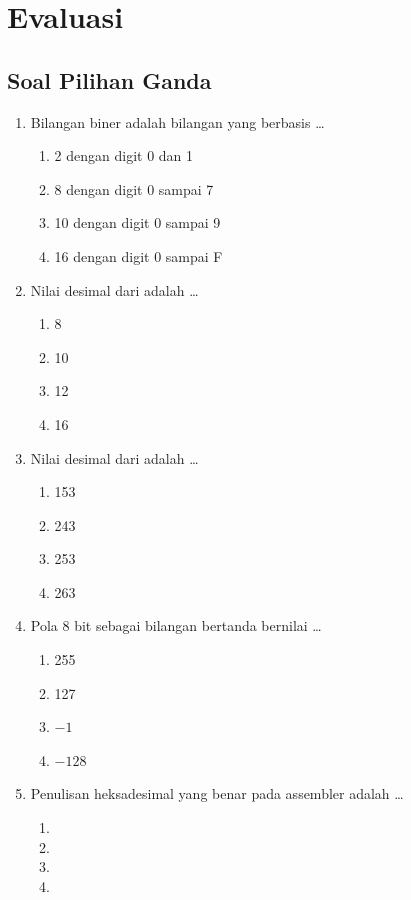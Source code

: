 \section{Evaluasi}
\label{sec:evaluasi-bab3}

\subsection{Soal Pilihan Ganda}

\begin{enumerate}
    \item Bilangan biner adalah bilangan yang berbasis \dots
          \begin{enumerate}
              \item 2 dengan digit 0 dan 1
              \item 8 dengan digit 0 sampai 7
              \item 10 dengan digit 0 sampai 9
              \item 16 dengan digit 0 sampai F
          \end{enumerate}

    \item Nilai desimal dari  adalah \dots
          \begin{enumerate}
              \item 8 \item 10 \item 12 \item 16
          \end{enumerate}

    \item Nilai desimal dari  adalah \dots
          \begin{enumerate}
              \item 153 \item 243 \item 253 \item 263
          \end{enumerate}

    \item Pola 8 bit  sebagai bilangan bertanda
          bernilai \dots
          \begin{enumerate}
              \item 255 \item 127 \item $-1$ \item $-128$
          \end{enumerate}

    \item Penulisan heksadesimal yang benar pada assembler adalah
          \dots
          \begin{enumerate}
              \item {} \item {}
              \item {} \item {}
          \end{enumerate}
\end{enumerate}

